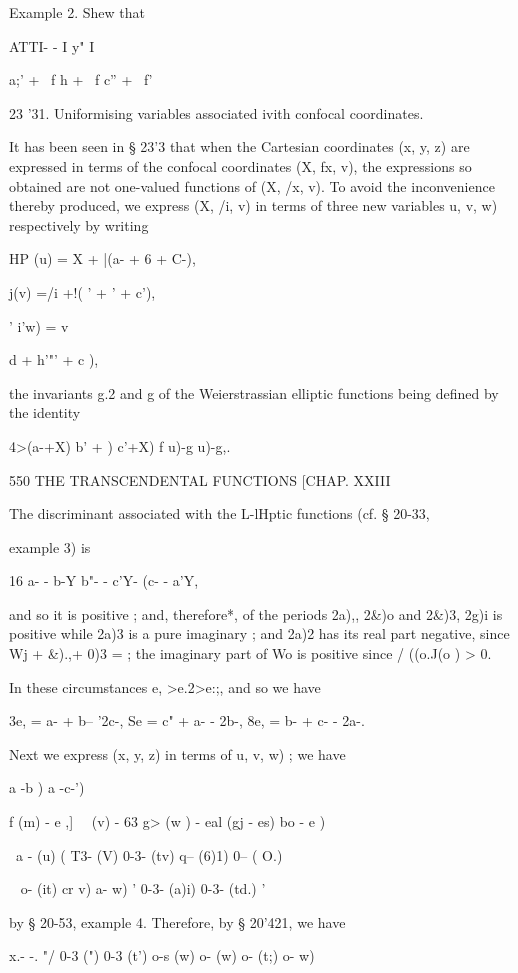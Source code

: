{{Example 2. Shew that 

ATTI- -  I y"  I   

   a;' + \ f  h  + \ f  c'' + \ f' 

23 '31. Uniformising variables associated ivith confocal coordinates. 

It has been seen in § 23'3 that when the Cartesian coordinates (x, y, z) 
are expressed in terms of the confocal coordinates (X, fx, v), the expressions so 
obtained are not one-valued functions of (X, /x, v). To avoid the inconvenience 
thereby produced, we express (X, /i, v) in terms of three new variables  u, v, w) 
respectively by writing 

HP (u) = X + |(a- + 6  + C-), 

 j(v) =/i +!( ' +  ' + c'), 

'  i'w) = v   \ \ {d  + h'"' + c ), 

the invariants g.2 and g  of the Weierstrassian elliptic functions being defined 
by the identity 

4>(a-+X) b' +  )  c'+X) f u)-g  u)-g,. 



550 THE TRANSCENDENTAL FUNCTIONS [CHAP. XXIII 

The discriminant associated with the L-lHptic functions (cf. § 20-33, 

example 3) is 

16  a- - b-Y  b"- - c'Y- (c- - a'Y, 

and so it is positive ; and, therefore*, of the periods 2a),, 2\&)o and 2\&)3, 2g)i is 
positive while 2a)3 is a pure imaginary ; and 2a)2 has its real part negative, 
since Wj + \&).,+ 0)3 = ; the imaginary part of Wo is positive since / ((o.J(o ) > 0. 

In these circumstances e, >e.2>e:;, and so we have 

3e, = a- + b-- '2c-, Se  = c" + a- - 2b-, 8e, = b- + c- - 2a-. 

Next we express (x, y, z) in terms of  u, v, w) ; we have 

 a -b ) a -c-') 

   f (m) - e ,] \ \   (v) - 63   g> (w ) - eal 
(gj - es)  bo - e ) 

\  a - (u) ( T3- (V) 0-3- (tv) q-- (6)1) 0--  ( O.) 

~ o-  (it) cr  v) a-  w) ' 0-3- (a)i) 0-3- (td.) ' 

by § 20-53, example 4. Therefore, by § 20'421, we have 

x.- -. "/ 0-3 (") 0-3 (t') o-s (w) 
  o- (w) o- (t;) o-  w) 

}}}
